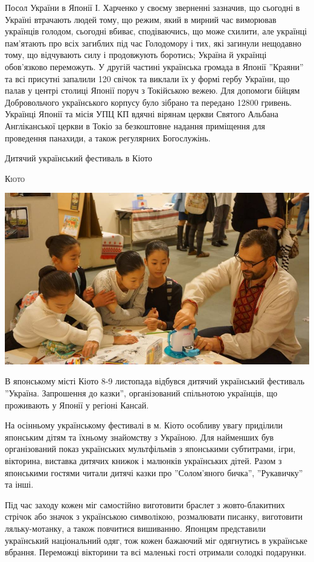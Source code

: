 \documentclass[10pt,a4paper]{article}
\newcommand{\NewsItem}[1]{%
		\usefont{T2A}{iwona}{m}{n} 
		\large #1 \vspace{4pt}
		\par \normalsize \normalfont}
\newcommand{\NewsAuthor}[1]{%
			\hfill \textsc{#1} \vspace{4pt}
			\par \normalfont}
\begin{document}
\begin{multicols}{3}
Посол України в Японії І. Харченко у своєму зверненні зазначив, що сьогодні в Україні втрачають людей тому, що режим, який в мирний час виморював українців голодом, сьогодні вбиває, сподіваючись, що може схилити, але українці пам'ятають про всіх загиблих під час Голодомору і тих, які загинули нещодавно тому, що відчувають силу і продовжують боротись; Україна й українці обов'язково переможуть.
У другій частині українська громада в Японії ''Краяни'' та всі присутні запалили 120 свічок та виклали їх у формі гербу України, що палав у центрі столиці Японії поруч з Токійською вежею.
Для допомоги бійцям Добровольчого українського корпусу було зібрано та передано 12800 гривень.
Українці Японії та місія УПЦ КП вдячні вірянам церкви Святого Альбана Англіканської церкви в Токіо за безкоштовне надання приміщення для проведення панахиди, а також регулярних Богослужінь.

\vspace{1cm}
\NewsItem{Дитячий український фестиваль в Кіото}
\NewsAuthor{Кіото}
		\begin{center}
			\includegraphics[width=0.8\linewidth]{images/kids-fest-kioto}
		\end{center}
В японському місті Кіото 8-9 листопада відбувся дитячий український фестиваль ''Україна. Запрошення до казки'', організований спільнотою українців, що проживають у Японії у регіоні Кансай.

На осінньому українському фестивалі в м. Кіото особливу увагу приділили японським дітям та їхньому знайомству з Україною. Для найменших був організований показ українських мультфільмів з японськими субтитрами, ігри, вікторина, виставка дитячих книжок і малюнків українських дітей. Разом з японськими гостями читали дитячі казки про ''Солом'яного бичка'', ''Рукавичку'' та інші.

Під час заходу кожен міг самостійно виготовити браслет з жовто-блакитних стрічок або значок з українською символікою, розмалювати писанку, виготовити ляльку-мотанку, а також повчитися вишиванню. Японцям представили український національний одяг, тож кожен бажаючий міг одягнутись в українське вбрання. Переможці вікторини та всі маленькі гості отримали солодкі подарунки.


\end{multicols}
\end{document}
